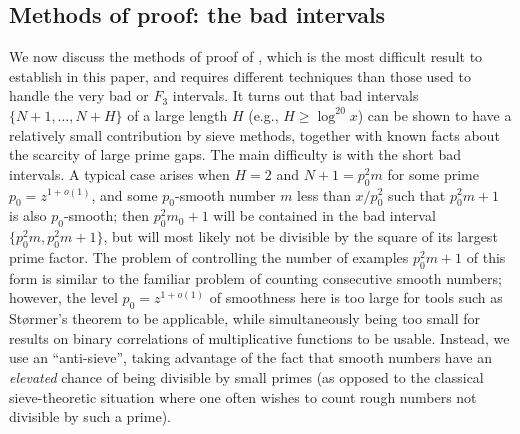 \documentclass[12pt]{amsart}
\begin{document}
\subsection{Methods of proof: the bad intervals}

We now discuss the methods of proof of , which is the most difficult result to establish in this paper, and requires different techniques than those used to handle the very bad or $F_3$ intervals.  It turns out that bad intervals $\{N+1,\dots,N+H\}$ of a large length $H$ (e.g., $H \geq \log^{20} x$) can be shown to have a relatively small contribution by sieve methods, together with known facts about the scarcity of large prime gaps.  The main difficulty is with the short bad intervals.  A typical case arises when $H=2$ and $N+1 = p_0^2 m$ for some prime $p_0 = z^{1+o(1)}$, and some $p_0$-smooth number $m$ less than $x/p_0^2$ such that $p_0^2 m + 1$ is also $p_0$-smooth; then $p_0^2 m_0+1$ will be contained in the bad interval $\{p_0^2 m, p_0^2 m+1\}$, but will most likely not be divisible by the square of its largest prime factor.  The problem of controlling the number of examples $p_0^2 m + 1$ of this form is similar to the familiar problem of counting consecutive smooth numbers; however, the level $p_0 = z^{1+o(1)}$ of smoothness here is too large for tools such as St{\o}rmer's theorem \cite{stormer} to be applicable, while simultaneously being too small for results on binary correlations of multiplicative functions \cite{teravainen} to be usable.  Instead, we use an ``anti-sieve'', taking advantage of the fact that smooth numbers have an \emph{elevated} chance of being divisible by small primes (as opposed to the classical sieve-theoretic situation where one often wishes to count rough numbers not divisible by such a prime).
\end{document}
